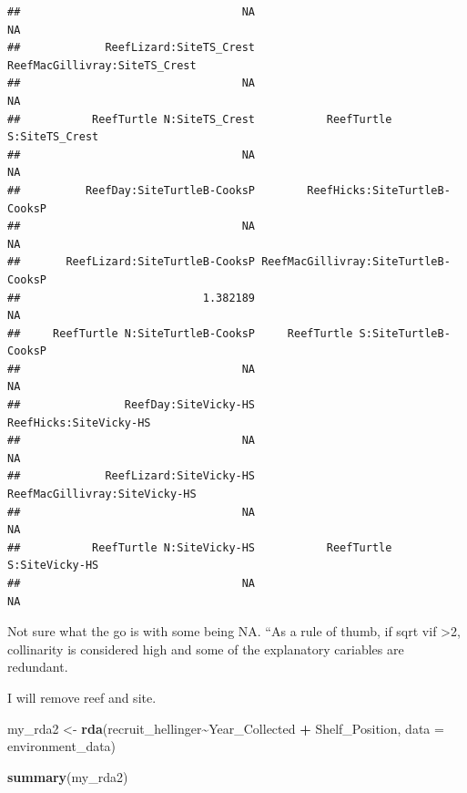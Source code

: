 \documentclass[
]{article}
\newenvironment{Shaded}{\begin{snugshade}}{\end{snugshade}}
\newcommand{\AttributeTok}[1]{\textcolor[rgb]{0.13,0.29,0.53}{#1}}
\newcommand{\FunctionTok}[1]{\textcolor[rgb]{0.13,0.29,0.53}{\textbf{#1}}}
\newcommand{\NormalTok}[1]{#1}
\newcommand{\OtherTok}[1]{\textcolor[rgb]{0.56,0.35,0.01}{#1}}
\newcommand{\SpecialCharTok}[1]{\textcolor[rgb]{0.81,0.36,0.00}{\textbf{#1}}}
\begin{document}
\begin{verbatim}
##                                  NA                                  NA 
##             ReefLizard:SiteTS_Crest       ReefMacGillivray:SiteTS_Crest 
##                                  NA                                  NA 
##           ReefTurtle N:SiteTS_Crest           ReefTurtle S:SiteTS_Crest 
##                                  NA                                  NA 
##          ReefDay:SiteTurtleB-CooksP        ReefHicks:SiteTurtleB-CooksP 
##                                  NA                                  NA 
##       ReefLizard:SiteTurtleB-CooksP ReefMacGillivray:SiteTurtleB-CooksP 
##                            1.382189                                  NA 
##     ReefTurtle N:SiteTurtleB-CooksP     ReefTurtle S:SiteTurtleB-CooksP 
##                                  NA                                  NA 
##                ReefDay:SiteVicky-HS              ReefHicks:SiteVicky-HS 
##                                  NA                                  NA 
##             ReefLizard:SiteVicky-HS       ReefMacGillivray:SiteVicky-HS 
##                                  NA                                  NA 
##           ReefTurtle N:SiteVicky-HS           ReefTurtle S:SiteVicky-HS 
##                                  NA                                  NA
\end{verbatim}

Not sure what the go is with some being NA. ``As a rule of thumb, if
sqrt vif \textgreater2, collinarity is considered high and some of the
explanatory cariables are redundant.

I will remove reef and site.

\begin{Shaded}
\begin{Highlighting}[]
\NormalTok{my\_rda2 }\OtherTok{\textless{}{-}} \FunctionTok{rda}\NormalTok{(recruit\_hellinger}\SpecialCharTok{\textasciitilde{}}\NormalTok{Year\_Collected }\SpecialCharTok{+}\NormalTok{ Shelf\_Position, }\AttributeTok{data =}\NormalTok{ environment\_data)}

\FunctionTok{summary}\NormalTok{(my\_rda2)}
\end{Highlighting}
\end{Shaded}
\end{document}
